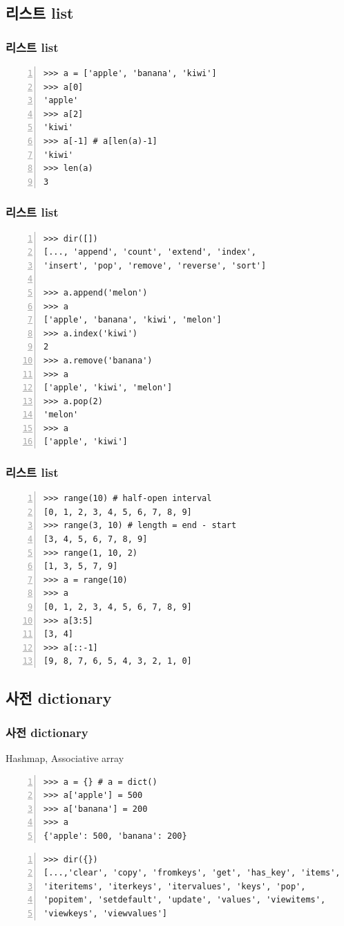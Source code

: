 \documentclass[10pt]{beamer}
\begin{document}
\subsection{리스트 list}
\begin{frame}[fragile]
\frametitle{리스트 list}
\begin{Verbatim}[numbers=left,commandchars=\\\{\}]
>>> a = ['apple', 'banana', 'kiwi']
>>> a[0]
'apple'
>>> a[2]
'kiwi'
>>> a[-1] # a[len(a)-1]
'kiwi'
>>> len(a)
3
\end{Verbatim}
\end{frame}

\begin{frame}[fragile]
\frametitle{리스트 list}
\begin{Verbatim}[numbers=left,commandchars=\\\{\}]
>>> dir([])
[..., 'append', 'count', 'extend', 'index',
'insert', 'pop', 'remove', 'reverse', 'sort']

>>> a.append('melon')
>>> a
['apple', 'banana', 'kiwi', 'melon']
>>> a.index('kiwi')
2
>>> a.remove('banana')
>>> a
['apple', 'kiwi', 'melon']
>>> a.pop(2)
'melon'
>>> a
['apple', 'kiwi']
\end{Verbatim}
\end{frame}

\begin{frame}[fragile]
\frametitle{리스트 list}
\begin{Verbatim}[numbers=left,commandchars=\\\{\}]
>>> range(10) # half-open interval
[0, 1, 2, 3, 4, 5, 6, 7, 8, 9]
>>> range(3, 10) # length = end - start
[3, 4, 5, 6, 7, 8, 9]
>>> range(1, 10, 2)
[1, 3, 5, 7, 9]
>>> a = range(10)
>>> a
[0, 1, 2, 3, 4, 5, 6, 7, 8, 9]
>>> a[3:5]
[3, 4]
>>> a[::-1]
[9, 8, 7, 6, 5, 4, 3, 2, 1, 0]
\end{Verbatim}
\end{frame}

\subsection{사전 dictionary}
\begin{frame}[fragile]
\frametitle{사전 dictionary}
Hashmap, Associative array
\begin{Verbatim}[numbers=left]
>>> a = {} # a = dict()
>>> a['apple'] = 500
>>> a['banana'] = 200
>>> a
{'apple': 500, 'banana': 200}
\end{Verbatim}
\vspace{2mm}
\begin{Verbatim}[numbers=left]
>>> dir({})
[...,'clear', 'copy', 'fromkeys', 'get', 'has_key', 'items',
'iteritems', 'iterkeys', 'itervalues', 'keys', 'pop',
'popitem', 'setdefault', 'update', 'values', 'viewitems',
'viewkeys', 'viewvalues']
\end{Verbatim}
\end{frame}
\end{document}
